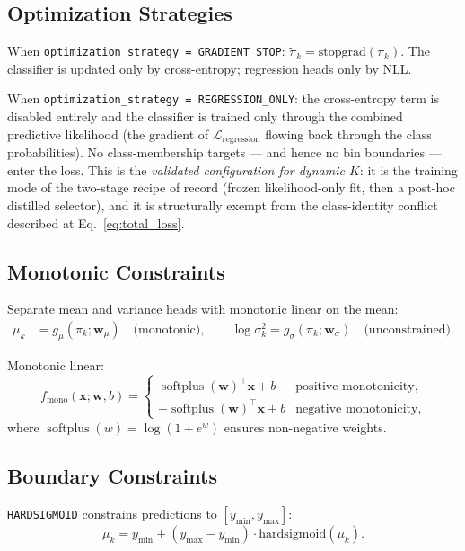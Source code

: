 \documentclass[11pt,a4paper]{article}
\theoremstyle{definition}
\newcommand{\bx}{\mathbf{x}}
\newcommand{\bw}{\mathbf{w}}
\DeclareMathOperator{\softplus}{softplus}
\begin{document}
\subsection{Optimization Strategies}

When \texttt{optimization\_strategy = GRADIENT\_STOP}:
$\tilde{\pi}_k = \mathrm{stopgrad}(\pi_k)$.
The classifier is updated only by cross-entropy; regression heads only by NLL.

When \texttt{optimization\_strategy = REGRESSION\_ONLY}: the cross-entropy term is disabled
entirely and the classifier is trained only through the combined predictive likelihood (the
gradient of $\mathcal{L}_{\mathrm{regression}}$ flowing back through the class probabilities).
No class-membership targets — and hence no bin boundaries — enter the loss. This is the
\emph{validated configuration for dynamic $K$}: it is the training mode of the two-stage
recipe of record (frozen likelihood-only fit, then a post-hoc distilled selector), and it is
structurally exempt from the class-identity conflict described at Eq.~\eqref{eq:total_loss}.

\subsection{Monotonic Constraints}

Separate mean and variance heads with monotonic linear on the mean:
\begin{align}
  \mu_k &= g_{\mu}(\pi_k; \bw_\mu) \quad \text{(monotonic)}, \qquad
  \log\sigma_k^2 = g_{\sigma}(\pi_k; \bw_\sigma) \quad \text{(unconstrained)}.
\end{align}

Monotonic linear:
\[
  f_{\text{mono}}(\bx; \bw, b) =
  \begin{cases}
    \softplus(\bw)^\top \bx + b & \text{positive monotonicity}, \\
    -\softplus(\bw)^\top \bx + b & \text{negative monotonicity},
  \end{cases}
\]
where $\softplus(w) = \log(1 + e^w)$ ensures non-negative weights.

\subsection{Boundary Constraints}

\texttt{HARDSIGMOID} constrains predictions to $[y_{\min}, y_{\max}]$:
\[
  \tilde{\mu}_k = y_{\min} + (y_{\max} - y_{\min}) \cdot \mathrm{hardsigmoid}(\mu_k).
\]
\end{document}
